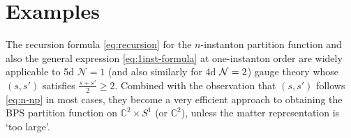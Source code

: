 \documentclass[letterpaper, 11pt]{article}
\def\IC{\mathbb{C}}
\def\CN{{\cal N}}
\begin{document}
{%






\section{Examples} \label{sec:example}

The recursion formula \eqref{eq:recursion} for the $n$-instanton partition function and also the general expression \eqref{eq:1inst-formula} at one-instanton order are widely applicable to 5d $\mathcal{N}=1$ (and also similarly for 4d $\CN=2$) gauge theory whose $(s,s')$ satisfies $\frac{s+s'}{2}\geq 2$. Combined with the observation that $(s,s')$ follows \eqref{eq:n-np} in most cases, they become a very efficient approach to obtaining the BPS partition function on $\IC^2 \times S^1$ (or $\IC^2$), unless the matter representation is `too large'. 

}
\end{document}
